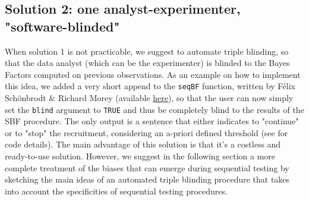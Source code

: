 \documentclass[a4paper,man,natbib,floatsintext,donotrepeattitle]{apa6}
\begin{document}
\subsection{Solution 2: one analyst-experimenter, "software-blinded"}
When solution 1 is not practicable, we suggest to automate triple blinding, so that the data analyst (which can be the experimenter) is blinded to the Bayes Factors computed on previous observations. As an example on how to implement this idea, we added a very short append to the \texttt{seqBF} function, written by Félix Schönbrodt \& Richard Morey (available \href{https://raw.githubusercontent.com/richarddmorey/BayesFactorExtras/master/BayesFactorExtras/R/seqBF.R}{here}), so that the user can now simply set the \texttt{blind} argument to \texttt{TRUE} and thus be completely blind to the results of the SBF procedure. The only output is a sentence that either indicates to "continue" or to "stop" the recruitment, considering an a-priori defined threshold (see  for code details). The main advantage of this solution is that it's a costless and ready-to-use solution. However, we suggest in the following section a more complete treatment of the biases that can emerge during sequential testing by sketching the main ideas of an automated triple blinding procedure that takes into account the specificities of sequential testing procedures.
\end{document}
